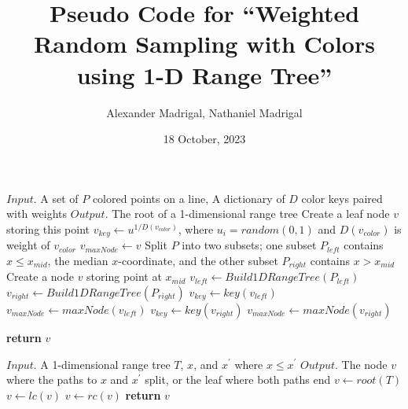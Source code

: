 \documentclass{article}
\title{Pseudo Code for ``Weighted Random Sampling with Colors using 1-D Range Tree''}
\author{Alexander Madrigal, Nathaniel Madrigal}
\date{18 October, 2023}
\begin{document}
\maketitle

\begin{algorithm}
\caption{$Build1DRangeTree(P)$}
\begin{algorithmic}[1]
    \Statex $Input.$ A set of $P$ colored points on a line, A dictionary of $D$ color keys paired with \Statex \hspace{28 pt} weights
    \Statex $Output.$ The root of a 1-dimensional range tree
        \State Create a leaf node $v$ storing this point
        \State $v_{key} \gets u^{1/D(v_{color})}$, where $u_i = random(0,1)$ and $D(v_{color})$ is weight of \Statex \hspace{11.5 pt} $v_{color}$
        \State $v_{maxNode} \gets v$
    \Else 
        \State Split $P$ into two subsets; one subset $P_{left}$ contains $x \le x_{mid}$, the median \Statex \hspace{11.5 pt} $x$-coordinate, and the other subset $P_{right}$ contains $x > x_{mid}$
        \State Create a node $v$ storing point at $x_{mid}$
        \State $v_{left} \gets Build1DRangeTree(P_{left})$
        \State $v_{right} \gets Build1DRangeTree(P_{right})$
            \State $v_{key} \gets key(v_{left})$
            \State $v_{maxNode} \gets maxNode(v_{left})$ 
        \Else
            \State $v_{key} \gets key(v_{right})$
            \State $v_{maxNode} \gets maxNode(v_{right})$ 
            
        \EndIf
    \EndIf
    \State \textbf{return} $v$    
\end{algorithmic}
\end{algorithm}

\begin{algorithm}
\caption{$FindSplitNode(T, x, x^\prime)$}
\begin{algorithmic}[1]
    \Statex $Input.$ A 1-dimensional range tree $T$, $x$, and $x^\prime$ where $x \le x^\prime$
    \Statex $Output.$ The node $v$ where the paths to $x$ and $x^\prime$ split, or the leaf where both paths end
    \State $v \gets root(T)$
        \State $v \gets lc(v)$
        \Else 
        \State $v \gets rc(v)$
        \EndIf
    \EndWhile
    \State \textbf{return} $v$
\end{algorithmic}
\end{algorithm}
\end{document}
